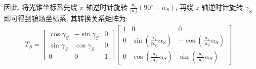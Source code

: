 \documentclass[../main.tex]{subfiles}
\begin{document}
  \par 因此, 将光锥坐标系先绕 $x$ 轴逆时针旋转 $ \frac{\boldsymbol{x}_i}{|\boldsymbol{x}_i|}\left( 90^{\circ}-\alpha _S \right) $, 再绕 $z$ 轴逆时针旋转 $\gamma_S$即可得到镜场坐标系, 其转换关系矩阵为:
\begin{align}    \label{1.17}
T_S = \begin{bmatrix} 
\cos\gamma_S & -\sin\gamma_S & 0 \\
\sin\gamma_S & \cos\gamma_S & 0 \\
0 & 0 & 1 
\end{bmatrix}
\begin{bmatrix} 
1 & 0 & 0 \\
0 & \sin\left(\frac{\boldsymbol{x}_i}{|\boldsymbol{x}_i|}\alpha _S\right) & -\cos\left(\frac{\boldsymbol{x}_i}{|\boldsymbol{x}_i|}\alpha _S\right) \\
0 & \cos\left(\frac{\boldsymbol{x}_i}{|\boldsymbol{x}_i|}\alpha _S\right) & \sin\left(\frac{\boldsymbol{x}_i}{|\boldsymbol{x}_i|}\alpha _S\right) 
\end{bmatrix}
\end{align}
\end{document}
